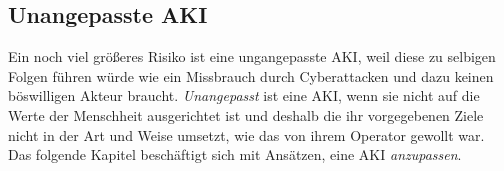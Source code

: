 \subsection{Unangepasste AKI}
Ein noch viel größeres Risiko ist eine ungangepasste AKI, weil diese zu selbigen Folgen führen würde wie ein Missbrauch durch Cyberattacken und dazu keinen böswilligen Akteur braucht. \emph{Unangepasst} ist eine AKI, wenn sie nicht auf die Werte der Menschheit ausgerichtet ist und deshalb die ihr vorgegebenen Ziele nicht in der Art und Weise umsetzt, wie das von ihrem Operator gewollt war. Das folgende Kapitel beschäftigt sich mit Ansätzen, eine AKI \emph{anzupassen}.
%
%
%

